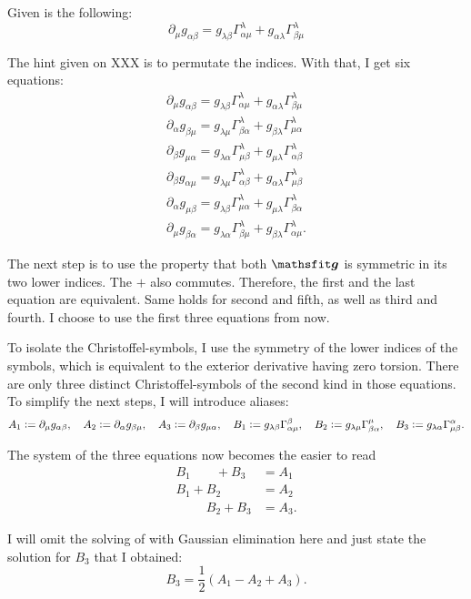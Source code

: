 \newcommand\equ[3]{\partial_{#1} g_{{#2}{#3}} = g_{\lambda{#3}} \Gamma^\lambda_{{#2}{#1}} + g_{{#2}\lambda} \Gamma^\lambda_{{#3}{#1}}}

Given is the following:
\[
    \equ\mu\alpha\beta
\]

The hint given on XXX is to permutate the indices. With that, I get six
equations:
\begin{gather*}
    \equ\mu\alpha\beta \\
    \equ\alpha\beta\mu \\
    \equ\beta\mu\alpha \\
    \equ\beta\alpha\mu \\
    \equ\alpha\mu\beta \\
    \equ\mu\beta\alpha.
\end{gather*}

The next step is to use the property that both $\tens g$ is symmetric in its
two lower indices. The $+$ also commutes. Therefore, the first and the last
equation are equivalent. Same holds for second and fifth, as well as third and
fourth. I choose to use the first three equations from now.

To isolate the Christoffel-symbols, I use the symmetry of the lower indices of
the symbols, which is equivalent to the exterior derivative having zero
torsion. There are only three distinct Christoffel-symbols of the second kind
in those equations. To simplify the next steps, I will introduce aliases:
\[
    A_1 := \partial_\mu g_{\alpha\beta}
    ,\quad
    A_2 := \partial_\alpha g_{\beta\mu}
    ,\quad
    A_3 := \partial_\beta g_{\mu\alpha}
    ,\quad
    B_1 := g_{\lambda\beta} \Gamma^{\beta}_{{\alpha}{\mu}}
    ,\quad
    B_2 := g_{\lambda\mu} \Gamma^{\mu}_{{\beta}{\alpha}}
    ,\quad
    B_3 := g_{\lambda\alpha} \Gamma^{\alpha}_{{\mu}{\beta}}.
\]

The system of the three equations now becomes the easier to read
\begin{align*}
    B_1 \phantom{+B_2} + B_3 &= A_1 \\
    B_1 + B_2 \phantom{+ B_3} &= A_2 \\
    \phantom{B_1 +} B_2 + B_3 &= A_3.
\end{align*}

I will omit the solving of with Gaussian elimination here and just state the
solution for $B_3$ that I obtained:
\[
    B_3 = \frac12 (A_1 - A_2 + A_3).
\]

